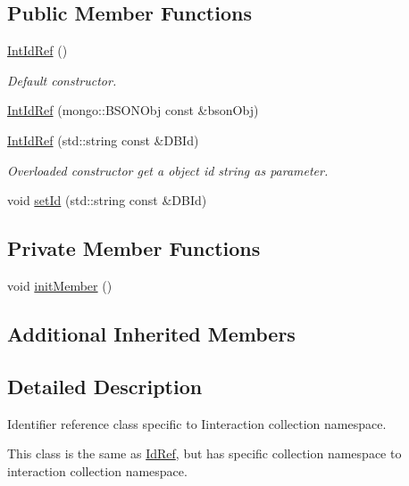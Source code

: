 \subsection*{Public Member Functions}
\begin{DoxyCompactItemize}
\item 
\hyperlink{classunisys_1_1IntIdRef_afa1d82873ccc405149c1e073dbfd2cc6}{Int\-Id\-Ref} ()
\begin{DoxyCompactList}\small\item\em Default constructor. \end{DoxyCompactList}\item 
\hyperlink{classunisys_1_1IntIdRef_a722c49f5b755c419b51a00875452b771}{Int\-Id\-Ref} (mongo\-::\-B\-S\-O\-N\-Obj const \&bson\-Obj)
\item 
\hyperlink{classunisys_1_1IntIdRef_a2d8d7ac9eb2e41c2208611aa05432c94}{Int\-Id\-Ref} (std\-::string const \&D\-B\-Id)
\begin{DoxyCompactList}\small\item\em Overloaded constructor get a object id string as parameter. \end{DoxyCompactList}\item 
void \hyperlink{classunisys_1_1IntIdRef_a89b80ebd239b94464cc8ca5456a7eb61}{set\-Id} (std\-::string const \&D\-B\-Id)
\end{DoxyCompactItemize}
\subsection*{Private Member Functions}
\begin{DoxyCompactItemize}
\item 
void \hyperlink{classunisys_1_1IntIdRef_ac47ec397256560f71d447841354c6e20}{init\-Member} ()
\end{DoxyCompactItemize}
\subsection*{Additional Inherited Members}


\subsection{Detailed Description}
Identifier reference class specific to Iinteraction collection namespace. 

This class is the same as \hyperlink{classunisys_1_1IdRef}{Id\-Ref}, but has specific collection namespace to interaction collection namespace. 

